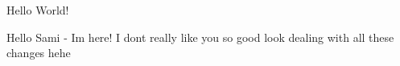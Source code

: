 \documentclass[10pt,a4paper]{article}
\begin{document}
Hello World!

Hello Sami - Im here! I dont really like you so good look dealing with all these changes hehe 
\end{document}
